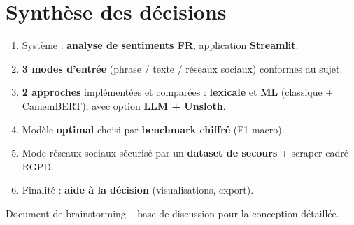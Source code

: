 \documentclass[11pt,a4paper]{article}
\begin{document}
\section{Synthèse des décisions}
\begin{enumerate}[leftmargin=1.2cm,nosep]
  \item Système : \textbf{analyse de sentiments FR}, application \textbf{Streamlit}.
  \item \textbf{3 modes d'entrée} (phrase / texte / réseaux sociaux) conformes au sujet.
  \item \textbf{2 approches} implémentées et comparées : \textbf{lexicale} et \textbf{ML}
        (classique + CamemBERT), avec option \textbf{LLM + Unsloth}.
  \item Modèle \textbf{optimal} choisi par \textbf{benchmark chiffré} (F1-macro).
  \item Mode réseaux sociaux sécurisé par un \textbf{dataset de secours} + scraper cadré RGPD.
  \item Finalité : \textbf{aide à la décision} (visualisations, export).
\end{enumerate}

\vfill
\begin{center}\color{gris}\small
Document de brainstorming -- base de discussion pour la conception détaillée.
\end{center}
\end{document}
